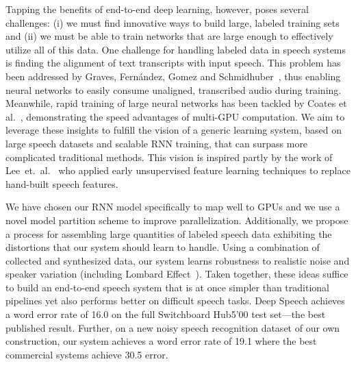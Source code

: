 Tapping the benefits of end-to-end deep learning, however, poses several
challenges: (i) we must find innovative ways to build large, labeled training
sets and (ii) we must be able to train networks that are large enough to
effectively utilize all of this data. One challenge for handling labeled data
in speech systems is finding the alignment of text transcripts with input
speech. This problem has been addressed by Graves, Fern\'{a}ndez, Gomez and
Schmidhuber~\cite{graves2006}, thus enabling neural networks to easily consume
unaligned, transcribed audio during training. Meanwhile, rapid training of
large neural networks has been tackled by Coates et
al.~\cite{coates2013cotshpc}, demonstrating the speed advantages of multi-GPU
computation. We aim to leverage these insights to fulfill the vision of a
generic learning system, based on large speech datasets and scalable RNN
training, that can surpass more complicated traditional methods. This vision
is inspired partly by the work of Lee~et.~al.~\cite{lee2009} who
applied early unsupervised feature learning techniques to replace hand-built
speech features.

We have chosen our RNN model specifically to map well to GPUs and we use a
novel model partition scheme to improve parallelization. Additionally, we
propose a process for assembling large quantities of labeled speech data
exhibiting the distortions that our system should learn to handle. Using a
combination of collected and synthesized data, our system learns robustness to
realistic noise and speaker variation (including Lombard
Effect~\cite{junqua1993lombard}). Taken together, these ideas suffice to build
an end-to-end speech system that is at once simpler than traditional pipelines
yet also performs better on difficult speech tasks. Deep Speech achieves a word
error rate of 16.0 on the full Switchboard Hub5'00 test set---the best
published result. Further, on a new noisy speech recognition dataset of our own
construction, our system achieves a word error rate of 19.1 where the best
commercial systems achieve 30.5 error.
